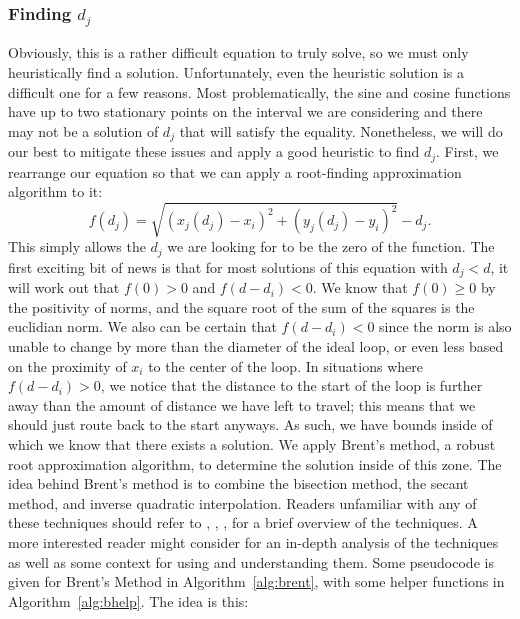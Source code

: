 \documentclass[twocolumn,12pt]{article}
\begin{document}
\subsubsection{Finding $d_j$}
Obviously, this is a rather difficult equation to truly solve, so we must only
heuristically find a solution. Unfortunately, even the heuristic solution is
a difficult one for a few reasons. Most problematically, the sine and cosine
functions have up to two stationary points on the interval we are considering
and there may not be a solution of $d_j$ that will satisfy the equality.
Nonetheless, we will do our best to mitigate these issues and apply a good
heuristic to find $d_j$. First, we rearrange our equation so that we can apply
a root-finding approximation algorithm to it:
\[ f(d_j) = \sqrt{(x_j(d_j) - x_i)^2 + (y_j(d_j) - y_i)^2} - d_j. \]
This simply allows the $d_j$ we are looking for to be the zero of the function.
The first exciting bit of news is that for most solutions of this equation with
$d_j < d$, it will work out that $f(0) > 0$ and $f(d-d_i) < 0$.
We know that $f(0) \geq 0$ by the
positivity of norms, and the square root of the sum of the squares is the
euclidian norm. We also can be certain that $f(d-d_i) < 0$ since
the norm is also unable to change by more than the diameter
of the ideal loop, or even less based on the proximity of $x_i$ to the center of
the loop. In situations where $f(d-d_i) > 0$, we notice that the distance to the
start of the loop is further away than the amount of distance we have left to
travel; this means that we should just route back to the start anyways. As such,
we have bounds inside of which we know that there exists a solution. We apply
Brent's method, a robust root approximation algorithm, to determine the solution
inside of this zone. The idea behind Brent's method is to combine the bisection
method, the secant method, and inverse quadratic interpolation. Readers
unfamiliar with any of these techniques should refer to ,
, ,  for a brief
overview of the techniques. A more interested reader might consider
 for an in-depth analysis of the techniques as well as some
context for using and understanding them. Some pseudocode is given for Brent's
Method in Algorithm~\ref{alg:brent}, with some helper functions in
Algorithm~\ref{alg:bhelp}. The idea
is this:
\end{document}

